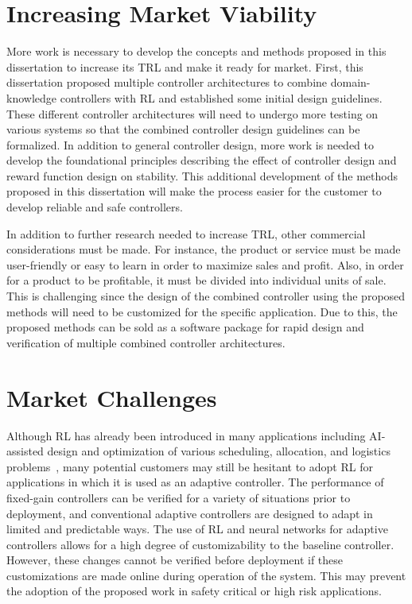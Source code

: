 \section{Increasing Market Viability}
More work is necessary to develop the concepts and methods proposed in this dissertation to increase its TRL and make it ready for market. First, this dissertation proposed multiple controller architectures to combine domain-knowledge controllers with RL and established some initial design guidelines. These different controller architectures will need to undergo more testing on various systems so that the combined controller design guidelines can be formalized.
%
In addition to general controller design, more work is needed to develop the foundational principles describing the effect of controller design and reward function design on stability. This additional development of the methods proposed in this dissertation will make the process easier for the customer to develop reliable and safe controllers.

In addition to further research needed to increase TRL, other commercial considerations must be made.
For instance, the product or service must be made user-friendly or easy to learn in order to maximize sales and profit. Also, in order for a product to be profitable, it must be divided into individual units of sale. This is challenging since the design of the combined controller using the proposed methods will need to be customized for the specific application.
%
Due to this, the proposed methods can be sold as a software package for rapid design and verification of multiple combined controller architectures.

\section{Market Challenges}
%
Although RL has already been introduced in many applications including AI-assisted design and optimization of various scheduling, allocation, and logistics problems~\cite{Kuhnle:2021a,Panzer:2022a}, many potential customers may still be hesitant to adopt RL for applications in which it is used as an adaptive controller. The performance of fixed-gain controllers can be verified for a variety of situations prior to deployment, and conventional adaptive controllers are designed to adapt in limited and predictable ways.
The use of RL and neural networks for adaptive controllers allows for a high degree of customizability to the baseline controller. However, these changes cannot be verified before deployment if these customizations are made online during operation of the system. This may prevent the adoption of the proposed work in safety critical or high risk applications.
%

